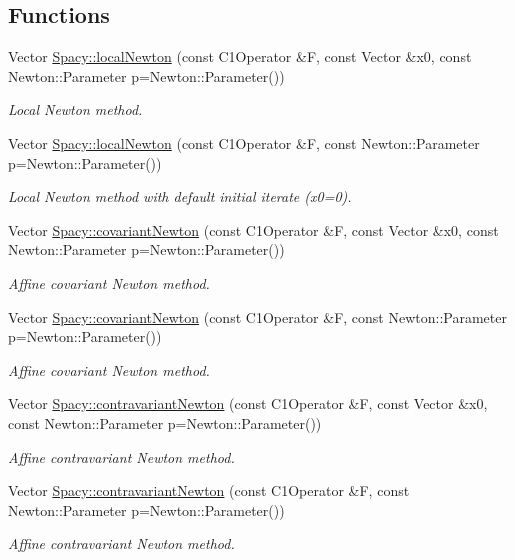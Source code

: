 \subsection*{Functions}
\begin{DoxyCompactItemize}
\item 
Vector \hyperlink{group__NewtonGroup_ga70230bc5f8b83684e04685b584967882}{Spacy\+::local\+Newton} (const C1\+Operator \&F, const Vector \&x0, const Newton\+::\+Parameter p=Newton\+::\+Parameter())
\begin{DoxyCompactList}\small\item\em Local Newton method. \end{DoxyCompactList}\item 
Vector \hyperlink{group__NewtonGroup_gad86d75d93e7d0307c492513c98c48fed}{Spacy\+::local\+Newton} (const C1\+Operator \&F, const Newton\+::\+Parameter p=Newton\+::\+Parameter())
\begin{DoxyCompactList}\small\item\em Local Newton method with default initial iterate (x0=0). \end{DoxyCompactList}\item 
Vector \hyperlink{group__NewtonGroup_ga0949f3b48cdec1915b947e716b56d707}{Spacy\+::covariant\+Newton} (const C1\+Operator \&F, const Vector \&x0, const Newton\+::\+Parameter p=Newton\+::\+Parameter())
\begin{DoxyCompactList}\small\item\em Affine covariant Newton method. \end{DoxyCompactList}\item 
Vector \hyperlink{group__NewtonGroup_ga1564e156effda6be6636e29333e8250d}{Spacy\+::covariant\+Newton} (const C1\+Operator \&F, const Newton\+::\+Parameter p=Newton\+::\+Parameter())
\begin{DoxyCompactList}\small\item\em Affine covariant Newton method. \end{DoxyCompactList}\item 
Vector \hyperlink{group__NewtonGroup_ga323071fce88ea5e655bb18fb4233101c}{Spacy\+::contravariant\+Newton} (const C1\+Operator \&F, const Vector \&x0, const Newton\+::\+Parameter p=Newton\+::\+Parameter())
\begin{DoxyCompactList}\small\item\em Affine contravariant Newton method. \end{DoxyCompactList}\item 
Vector \hyperlink{group__NewtonGroup_ga8cde4ccdf9479141f8f8b92607f0f724}{Spacy\+::contravariant\+Newton} (const C1\+Operator \&F, const Newton\+::\+Parameter p=Newton\+::\+Parameter())
\begin{DoxyCompactList}\small\item\em Affine contravariant Newton method. \end{DoxyCompactList}\end{DoxyCompactItemize}


